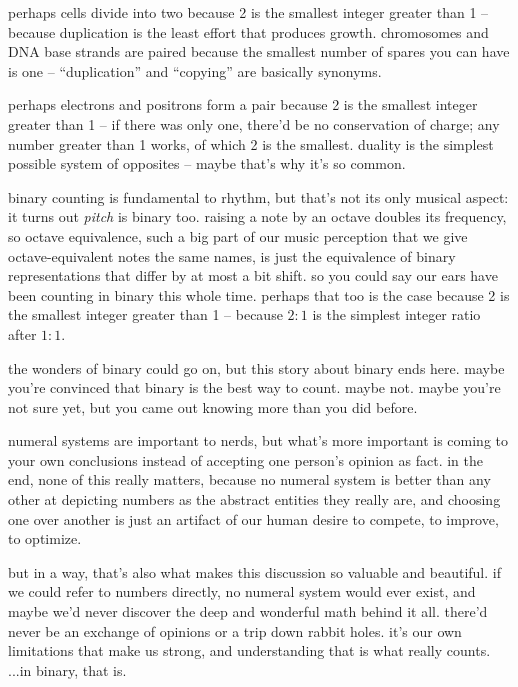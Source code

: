 \documentclass[../best.tex]{subfiles}
\begin{document}
perhaps cells divide into two because 2 is the smallest integer greater than 1 -- because duplication is the least effort that produces growth. chromosomes and DNA base strands are paired because the smallest number of spares you can have is one -- ``duplication'' and ``copying'' are basically synonyms.

perhaps electrons and positrons form a pair because 2 is the smallest integer greater than 1 -- if there was only one, there'd be no conservation of charge; any number greater than 1 works, of which 2 is the smallest. duality is the simplest possible system of opposites -- maybe that's why it's so common.

binary counting is fundamental to rhythm, but that's not its only musical aspect: it turns out \emph{pitch} is binary too. raising a note by an octave doubles its frequency, so octave equivalence, such a big part of our music perception that we give octave-equivalent notes the same names, is just the equivalence of binary representations that differ by at most a bit shift. so you could say our ears have been counting in binary this whole time. perhaps that too is the case because 2 is the smallest integer greater than 1 -- because $2:1$ is the simplest integer ratio after $1:1$.\myfootnote{}

the wonders of binary could go on, but this story about binary ends here. maybe you're convinced that binary is the best way to count. maybe not. maybe you're not sure yet, but you came out knowing more than you did before.

\newpage

numeral systems are important to nerds, but what's more important is coming to your own conclusions instead of accepting one person's opinion as fact. in the end, none of this really matters, because no numeral system is better than any other at depicting numbers as the abstract entities they really are, and choosing one over another is just an artifact of our human desire to compete, to improve, to optimize.

but in a way, that's also what makes this discussion so valuable and beautiful. if we could refer to numbers directly, no numeral system would ever exist, and maybe we'd never discover the deep and wonderful math behind it all. there'd never be an exchange of opinions or a trip down rabbit holes. it's our own limitations that make us strong, and understanding that is what really counts.\myfootnote{} ...in binary, that is.
\end{document}
